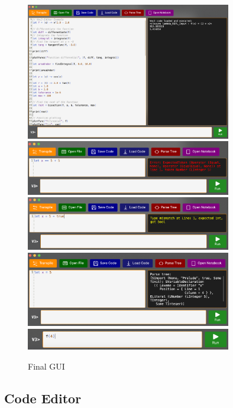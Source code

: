 \begin{figure}[H]
    \centering
    \includegraphics[width=0.8\textwidth]{assets/finalCodeEditor}
    \includegraphics[width=0.8\textwidth]{assets/finalGuiParserError}
    \includegraphics[width=0.8\textwidth]{assets/finalGuiTypeError}
    \includegraphics[width=0.8\textwidth]{assets/finalGuiParseTree}
    \includegraphics[width=0.8\textwidth]{assets/finalREPL}
    \caption{Final GUI}\label{fig:final-gui}
\end{figure}

\subsection{Code Editor}\label{subsec:code-editor}

